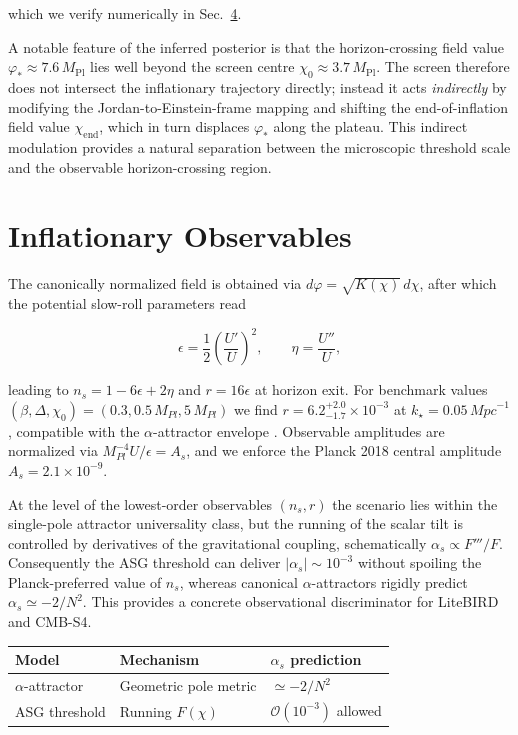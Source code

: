 \documentclass[
]{article}
\newcounter{none} %
\begin{document}
which we verify numerically in
Sec.~\hyperref[sec:inflationary-observables]{4}.

A notable feature of the inferred posterior is that the
horizon-crossing field value \(\varphi_{*} \approx 7.6\,M_{\mathrm{Pl}}\)
lies well beyond the screen centre
\(\chi_{0} \approx 3.7\,M_{\mathrm{Pl}}\). The screen therefore does not
intersect the inflationary trajectory directly; instead it acts
\emph{indirectly} by modifying the Jordan-to-Einstein-frame mapping and
shifting the end-of-inflation field value \(\chi_{\mathrm{end}}\), which
in turn displaces \(\varphi_{*}\) along the plateau. This indirect
modulation provides a natural separation between the microscopic threshold
scale and the observable horizon-crossing region.

\section{Inflationary Observables}\label{inflationary-observables}

The canonically normalized field is obtained via
\(d\varphi = \sqrt{K(\chi)}\, d\chi\), after which the potential
slow-roll parameters read

\[
\epsilon = \frac{1}{2}\left( \frac{U'}{U} \right)^{2},\quad\quad\eta = \frac{U''}{U},
\]

leading to \(n_{s} = 1 - 6\epsilon + 2\eta\) and \(r = 16\epsilon\) at
horizon exit. For benchmark values
\((\beta,\Delta,\chi_{0}) = (0.3,0.5\, M_{Pl},5\, M_{Pl})\) we find
\(r = {6.2}_{- 1.7}^{+ 2.0} \times 10^{- 3}\) at
\(k_{\star} = 0.05\,{Mpc}^{- 1}\), compatible with the
\(\alpha\)-attractor envelope . Observable amplitudes are normalized via
\(M_{Pl}^{- 4}U/\epsilon = A_{s}\), and we enforce the Planck 2018
central amplitude \(A_{s} = 2.1 \times 10^{- 9}\).

At the level of the lowest-order observables \((n_{s},r)\) the scenario
lies within the single-pole attractor universality class, but the
running of the scalar tilt is controlled by derivatives of the
gravitational coupling, schematically \(\alpha_{s} \propto F'''/F\).
Consequently the ASG threshold can deliver
\(|\alpha_{s}| \sim 10^{- 3}\) without spoiling the Planck-preferred
value of \(n_{s}\), whereas canonical \(\alpha\)-attractors rigidly
predict \(\alpha_{s} \simeq - 2/N^{2}\). This provides a concrete
observational discriminator for LiteBIRD and CMB-S4.

{\def\LTcaptype{none} %
\begin{longtable}[]{@{}lll@{}}
\toprule\noalign{}
Model & Mechanism & \(\alpha_{s}\) prediction \\
\midrule\noalign{}
\endhead
\bottomrule\noalign{}
\endlastfoot
\(\alpha\)-attractor & Geometric pole metric & \(\simeq - 2/N^{2}\) \\
ASG threshold & Running \(F(\chi)\) & \(\mathcal{O}(10^{- 3})\)
allowed \\
\end{longtable}
}
\end{document}
